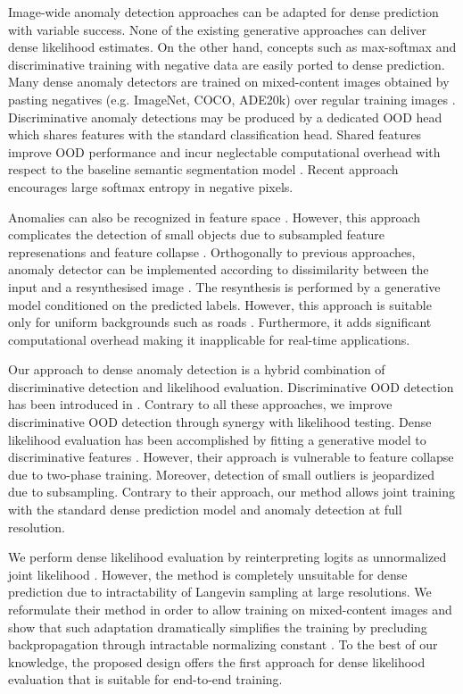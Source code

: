\documentclass[runningheads]{llncs}
\begin{document}
Image-wide anomaly detection approaches can be adapted for dense prediction with variable success.
None of the existing generative approaches can deliver dense likelihood estimates.
On the other hand, concepts such as max-softmax and discriminative training with negative data are easily ported to dense prediction.
Many dense anomaly detectors are trained on mixed-content images obtained by pasting negatives (e.g. ImageNet, COCO, ADE20k) over regular training images \cite{bevandic19gcpr,chan21iccv,biase21cvpr}.
Discriminative anomaly detections may be produced by a dedicated OOD head which shares features  with the standard classification head.
Shared features improve OOD performance and incur neglectable computational overhead with respect to the baseline semantic segmentation model \cite{bevandic19gcpr}.
Recent approach \cite{chan21iccv} encourages large softmax entropy in negative pixels.


Anomalies can also be recognized in feature space \cite{blum19iccvw}.
However, this approach complicates the detection of small objects due to subsampled feature represenations and feature collapse \cite{lucas19nips,amersfoort21arxiv}.
Orthogonally to previous approaches, anomaly detector can be implemented according to dissimilarity between the input and a resynthesised image \cite{lis19iccv,biase21cvpr,vojir21iccv}.
The resynthesis is performed by a generative model conditioned on the predicted labels.
However, this approach is suitable only for uniform backgrounds such as roads \cite{lis19iccv}. 
Furthermore, it adds significant computational overhead making it inapplicable for real-time applications.

Our approach to dense anomaly detection is a hybrid combination of  discriminative detection and likelihood evaluation. 
Discriminative OOD detection has been introduced in \cite{bevandic19gcpr,hendrycks19iclr,dhamija18nips}. 
Contrary to all these approaches, we improve discriminative OOD detection through synergy with likelihood testing.
Dense likelihood evaluation has been accomplished by fitting a generative model
to discriminative features \cite{blum19iccvw}.
However, their approach is vulnerable to feature collapse\cite{lucas19nips,amersfoort21arxiv} due to two-phase training.
Moreover, detection of small outliers is jeopardized due to subsampling.
Contrary to their approach, our  method allows joint training with the standard dense prediction model and anomaly detection at full resolution.

We perform dense likelihood evaluation by reinterpreting logits as 
unnormalized joint likelihood \cite{grathwohl20iclr}. 
However, the method \cite{grathwohl20iclr} is completely unsuitable for dense prediction due to intractability of Langevin sampling at large resolutions.
We reformulate their method in order to allow training on mixed-content images and show that such adaptation dramatically simplifies the training by precluding backpropagation through intractable normalizing constant .
To the best of our knowledge, the proposed design offers the first approach for dense likelihood evaluation that is suitable for end-to-end training.
\end{document}
